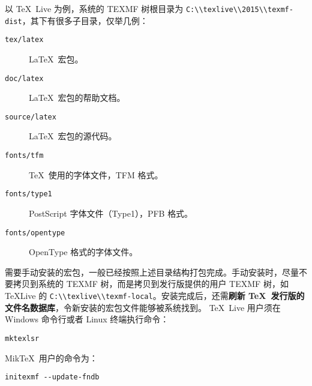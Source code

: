 以 \TeX\ Live 为例，系统的 TEXMF 树根目录为 \nolinkurl{C:\\texlive\\2015\\texmf-dist}，其下有很多子目录，仅举几例：
\begin{description}
  \item[\texttt{tex/latex}] \LaTeX\ 宏包。
  \item[\texttt{doc/latex}] \LaTeX\ 宏包的帮助文档。
  \item[\texttt{source/latex}] \LaTeX\ 宏包的源代码。
  \item[\texttt{fonts/tfm}] \TeX\ 使用的字体文件，TFM 格式。
  \item[\texttt{fonts/type1}] PostScript 字体文件（Type1），PFB 格式。
  \item[\texttt{fonts/opentype}] OpenType 格式的字体文件。
\end{description}

需要手动安装的宏包，一般已经按照上述目录结构打包完成。手动安装时，尽量不要拷贝到系统的 TEXMF 树，而是拷贝到发行版提供的用户 TEXMF 树，如
\TeX Live 的 \nolinkurl{C:\\texlive\\texmf-local}。安装完成后，还需\textbf{刷新 \TeX\ 发行版的文件名数据库}，令新安装的宏包文件能够被系统找到。
\TeX\ Live 用户须在 Windows 命令行或者 Linux 终端执行命令：
\begin{verbatim}
mktexlsr
\end{verbatim}
Mik\TeX\ 用户的命令为：
\begin{verbatim}
initexmf --update-fndb
\end{verbatim}

\endinput